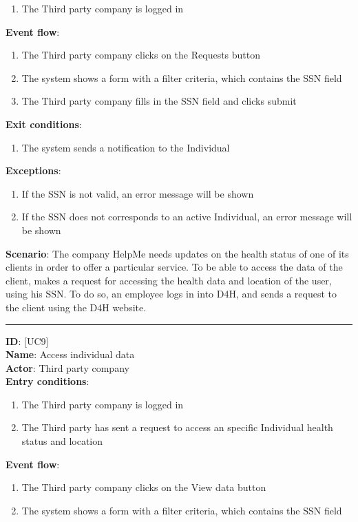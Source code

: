 \documentclass[a4paper, hidelinks, 12pt]{report}
\newcommand\usecase[1]{ [UC#1] }
\begin{document}
\begin{itemize}
\begin{enumerate}
			\item{The Third party company is logged in}
		\end{enumerate}
		\textbf{Event flow}:
		\begin{enumerate}
			\item{The Third party company clicks on the Requests button}
			\item{The system shows a form with a filter criteria, which contains the SSN field}
			\item{The Third party company fills in the SSN field and clicks submit}
		\end{enumerate}
		\textbf{Exit conditions}:
		\begin{enumerate}
			\item{The system sends a notification to the Individual}
		\end{enumerate}
		\textbf{Exceptions}:
		\begin{enumerate}
			\item{If the SSN is not valid, an error message will be shown}
			\item{If the SSN does not corresponds to an active Individual, an error message will be shown}
		\end{enumerate}
		\textbf{Scenario}: The company HelpMe needs updates on the health status of one of its clients in order to offer a particular service. To be able to access the data of the client, makes a request for accessing the health data and location of the user, using his SSN. To do so, an employee logs in into D4H, and sends a request to the client using the D4H website.\\
		\rule{\linewidth}{0.4pt}
		\textbf{ID}: \usecase{9} \\
		\textbf{Name}: Access individual data \\
		\textbf{Actor}: Third party company \\
		\textbf{Entry conditions}:
		\begin{enumerate}
			\item{The Third party company is logged in}
			\item{The Third party has sent a request to access an specific Individual health status and location}
		\end{enumerate}
		\textbf{Event flow}:
		\begin{enumerate}
			\item{The Third party company clicks on the View data button}
			\item{The system shows a form with a filter criteria, which contains the SSN field}

\end{enumerate}
\end{itemize}
\end{document}
